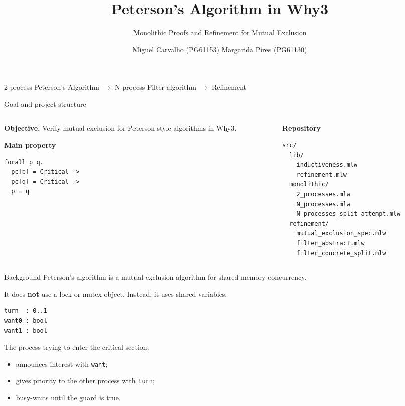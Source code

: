 \documentclass[aspectratio=169,10pt]{beamer}
\title{Peterson's Algorithm in Why3}
\subtitle{Monolithic Proofs and Refinement for Mutual Exclusion}
\author{Miguel Carvalho (PG61153) \quad\textbullet\quad Margarida Pires (PG61130)}
\date{}
\begin{document}
\begin{frame}
  \titlepage
  \vspace{-0.6cm}
  \begin{center}
    \small 2-process Peterson's Algorithm \quad $\rightarrow$ \quad N-process Filter algorithm \quad $\rightarrow$ \quad Refinement
  \end{center}
\end{frame}

\begin{frame}[fragile]{Goal and project structure}
\begin{columns}[T]
\begin{column}{0.43\textwidth}
\textbf{Objective.} Verify mutual exclusion for Peterson-style algorithms in Why3.

\vspace{0.4cm}
\textbf{Main property}
\begin{lstlisting}[language=why3]
forall p q.
  pc[p] = Critical ->
  pc[q] = Critical ->
  p = q
\end{lstlisting}
\end{column}
\begin{column}{0.53\textwidth}
\textbf{Repository}
\begin{lstlisting}
src/
  lib/
    inductiveness.mlw
    refinement.mlw
  monolithic/
    2_processes.mlw
    N_processes.mlw
    N_processes_split_attempt.mlw
  refinement/
    mutual_exclusion_spec.mlw
    filter_abstract.mlw
    filter_concrete_split.mlw
\end{lstlisting}
\end{column}
\end{columns}
\end{frame}

\begin{frame}[fragile]{Background}
Peterson's algorithm is a mutual exclusion algorithm for shared-memory concurrency.

\vspace{0.3cm}
It does \textbf{not} use a lock or mutex object. Instead, it uses shared variables:

\begin{lstlisting}
turn  : 0..1
want0 : bool
want1 : bool
\end{lstlisting}

\vspace{0.25cm}
The process trying to enter the critical section:
\begin{itemize}
  \item announces interest with \texttt{want};
  \item gives priority to the other process with \texttt{turn};
  \item busy-waits until the guard is true.
\end{itemize}
\end{frame}
\end{document}
